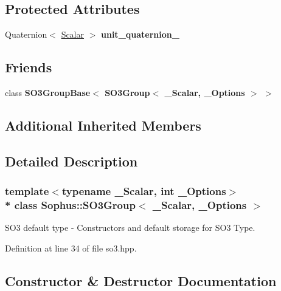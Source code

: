 \subsection*{Protected Attributes}
\begin{DoxyCompactItemize}
\item 
Quaternion$<$ \hyperlink{class_sophus_1_1_s_o3_group_a2b1432aa3eac9b174e41df7ce504cb06}{Scalar} $>$ {\bfseries unit\+\_\+quaternion\+\_\+}\hypertarget{class_sophus_1_1_s_o3_group_ac5c0b33c11c656c72e9b631482c69327}{}\label{class_sophus_1_1_s_o3_group_ac5c0b33c11c656c72e9b631482c69327}

\end{DoxyCompactItemize}
\subsection*{Friends}
\begin{DoxyCompactItemize}
\item 
class {\bfseries S\+O3\+Group\+Base$<$ S\+O3\+Group$<$ \+\_\+\+Scalar, \+\_\+\+Options $>$ $>$}\hypertarget{class_sophus_1_1_s_o3_group_ab7750315d441a8277148bc479ef978d2}{}\label{class_sophus_1_1_s_o3_group_ab7750315d441a8277148bc479ef978d2}

\end{DoxyCompactItemize}
\subsection*{Additional Inherited Members}


\subsection{Detailed Description}
\subsubsection*{template$<$typename \+\_\+\+Scalar, int \+\_\+\+Options$>$\\*
class Sophus\+::\+S\+O3\+Group$<$ \+\_\+\+Scalar, \+\_\+\+Options $>$}

S\+O3 default type -\/ Constructors and default storage for S\+O3 Type. 

Definition at line 34 of file so3.\+hpp.



\subsection{Constructor \& Destructor Documentation}
